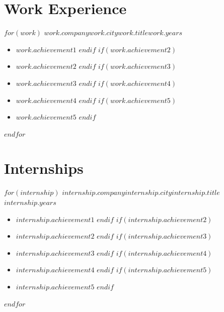 \documentclass[11pt]{cv-class}
\begin{document}


\section{Work Experience}
$for(work)$
    \noindent\textbf{$work.company$}\hfill{$work.city$}\break\textit{$work.title$}\hfill{$work.years$}
    \begin{itemize}[noitemsep,nolistsep,leftmargin=*]
        $if(work.achievement1)$ \item \raggedright{$work.achievement1$} $endif$
        $if(work.achievement2)$ \item \raggedright{$work.achievement2$} $endif$
        $if(work.achievement3)$ \item \raggedright{$work.achievement3$} $endif$
        $if(work.achievement4)$ \item \raggedright{$work.achievement4$} $endif$
        $if(work.achievement5)$ \item \raggedright{$work.achievement5$} $endif$
    \end{itemize}
    \bigskip
$endfor$

\section{Internships}
$for(internship)$
    \noindent\textbf{$internship.company$}\hfill{$internship.city$}\break\textit{$internship.title$}\hfill{$internship.years$}
    \begin{itemize}[noitemsep,nolistsep,leftmargin=*]
        $if(internship.achievement1)$ \item \raggedright{$internship.achievement1$} $endif$
        $if(internship.achievement2)$ \item \raggedright{$internship.achievement2$} $endif$
        $if(internship.achievement3)$ \item \raggedright{$internship.achievement3$} $endif$
        $if(internship.achievement4)$ \item \raggedright{$internship.achievement4$} $endif$
        $if(internship.achievement5)$ \item \raggedright{$internship.achievement5$} $endif$
    \end{itemize}
    \bigskip
$endfor$
\end{document}
